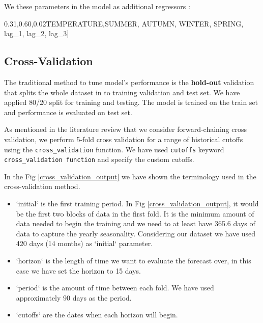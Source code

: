 \documentclass[mstat,12pt]{unswthesis}
\newenvironment{Shaded}{\begin{snugshade}}{\end{snugshade}}
\newcommand{\NormalTok}[1]{#1}
\newcommand{\StringTok}[1]{\textcolor[rgb]{0.31,0.60,0.02}{#1}}
\begin{document}
We these parameters in the model as additional regressors :

\begin{Shaded}
\begin{Highlighting}[]
\NormalTok{[}\StringTok{\textquotesingle{}TEMPERATURE\textquotesingle{}}\NormalTok{,}\StringTok{\textquotesingle{}SUMMER\textquotesingle{}}\NormalTok{, }\StringTok{\textquotesingle{}AUTUMN\textquotesingle{}}\NormalTok{, }\StringTok{\textquotesingle{}WINTER\textquotesingle{}}\NormalTok{, }\StringTok{\textquotesingle{}SPRING\textquotesingle{}}\NormalTok{, }
        \StringTok{\textquotesingle{}lag\_1\textquotesingle{}}\NormalTok{, }\StringTok{\textquotesingle{}lag\_2\textquotesingle{}}\NormalTok{, }\StringTok{\textquotesingle{}lag\_3\textquotesingle{}}\NormalTok{]}
\end{Highlighting}
\end{Shaded}

\subsection{Cross-Validation}\label{cross-validation}

The traditional method to tune model's performance is the
\textbf{hold-out} validation that splits the whole dataset in to
training validation and test set. We have applied 80/20 split for
training and testing. The model is trained on the train set and
performance is evaluated on test set.

As mentioned in the literature review that we consider forward-chaining
cross validation, we perform 5-fold cross validation for a range of
historical cutoffs using the \texttt{cross\_validation} function. We
have used \texttt{cutoffs} keyword \texttt{cross\_validation\ function}
and specify the custom cutoffs.

In the Fig \ref{cross_validation_output} we have shown the terminology
used in the cross-validation method.

\begin{itemize}
  \item `initial` is the first training period. In Fig \ref{cross_validation_output}, it would be the first two blocks of data in the first fold. It is the minimum amount of data needed to begin the training and we need to at least have 365.6 days of data to capture the yearly seasonality. Considering our dataset we have used 420 days  (14 months) as `initial` parameter.
  \item `horizon` is the length of time we want to evaluate the forecast over, in this case we have set the horizon to 15 days.
  \item `period` is the amount of time between each fold. We have used approximately 90 days as the period.
  \item `cutoffs` are the dates when each horizon will begin.
\end{itemize}
\end{document}
